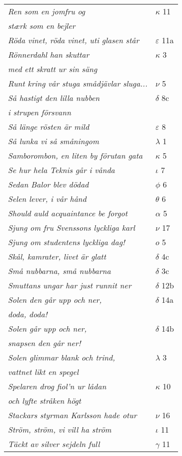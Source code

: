 \documentclass[a6paper,10pt]{article}
\begin{document}
\newpage
\begin{table}[!h]
\begin{tabular}{l l}
\textit{Ren som en jomfru og}	&$\kappa$ 11\\
\textit{stærk som en bejler} &\\
\textit{Röda vinet, röda vinet, uti glasen står}	&$\varepsilon$ 11a\\
\textit{Rönnerdahl han skuttar}	&$\kappa$ 3\\
\textit{med ett skratt ur sin säng} &\\
\textit{Runt kring vår stuga smådjävlar sluga...}	&$\nu$ 5\\
\textit{Så hastigt den lilla nubben}	&$\delta$ 8c\\
\textit{i strupen försvann} &\\
\textit{Så länge rösten är mild}	&$\varepsilon$ 8\\
\textit{Så lunka vi så småningom}	&$\lambda$ 1\\
\textit{Samborombon, en liten by förutan gata}	&$\kappa$ 5\\
\textit{Se hur hela Teknis går i vånda}	&$\iota$ 7\\
\textit{Sedan Balor blev dödad} &$\phi$ 6\\
\textit{Selen lever, i vår hånd}	&$\theta$ 6\\
\textit{Should auld acquaintance be forgot}	&$\alpha$ 5\\
\textit{Sjung om fru Svenssons lyckliga karl}	&$\nu$ 17\\
\textit{Sjung om studentens lyckliga dag!}	&$o$ 5\\
\textit{Skål, kamrater, livet är glatt}	&$\delta$ 4c\\
\textit{Små nubbarna, små nubbarna}	&$\delta$ 3c\\
\textit{Smuttans ungar har just runnit ner}	&$\delta$ 12b\\
\textit{Solen den går upp och ner,}	&$\delta$ 14a\\
\textit{doda, doda!} &\\
\textit{Solen går upp och ner,}	&$\delta$ 14b\\
\textit{snapsen den går ner!} &\\
\textit{Solen glimmar blank och trind,}	&$\lambda$ 3\\
\textit{vattnet likt en spegel} &\\
\textit{Spelaren drog fiol'n ur lådan}	&$\kappa$ 10\\
\textit{och lyfte stråken högt} &\\
\textit{Stackars styrman Karlsson hade otur}	&$\nu$ 16\\
\textit{Ström, ström, vi vill ha ström}	&$\iota$ 11\\
\textit{Täckt av silver sejdeln full}	&$\gamma$ 11\\
\end{tabular}
\end{table}
\end{document}
